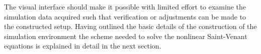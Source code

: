 The visual interface should make it possible with limited effort to examine the simulation data acquired such that verification or adjustments can be made to the constructed setup. 
Having outlined the basic details of the construction of the simulation environment the scheme needed to solve the nonlinear Saint-Venant equations is explained in detail in the next section. 